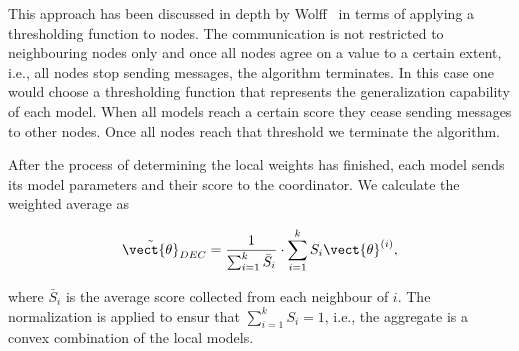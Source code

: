 This approach has been discussed in depth by Wolff~\cite{wolff2013local} in terms of applying a thresholding function to nodes.
The communication is not restricted to neighbouring nodes only and once all nodes agree on a value to a certain extent, i.e., all nodes stop sending messages, the algorithm terminates.
In this case one would choose a thresholding function that represents the generalization capability of each model.
When all models reach a certain score they cease sending messages to other nodes. 
Once all nodes reach that threshold we terminate the algorithm.

After the process of determining the local weights has finished, each model sends its model parameters and their score to the coordinator. 
We calculate the weighted average as 

\begin{equation}
    \tilde{\vect{\theta}}_{DEC} = \frac{1}{\sum_{i=1}^k \bar{S}_i} \cdot \sum_{i=1}^k S_i \vect{\theta}^{(i)},
\end{equation}

where $\bar{S}_i$ is the average score collected from each neighbour of $i$. 
The normalization is applied to ensur that $\sum_{i=1}^k S_i = 1$, i.e., the aggregate is a convex combination of the local models.

